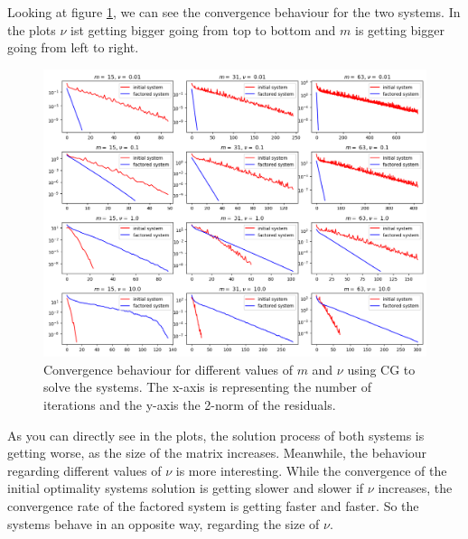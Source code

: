 \documentclass{amsart}
\theoremstyle{definition}
\theoremstyle{remark}
\numberwithin{equation}{section}
\begin{document}
Looking at figure \ref{fig:CG-convergence}, we can see the  convergence behaviour for the two systems. In the plots $\nu$ ist getting bigger going from top to bottom and $m$ is getting bigger going from left to right.
\begin{figure}[h!]
\centering
\includegraphics[scale=0.56]{./imgs/CG_analysis}
\caption{Convergence behaviour for different values of $m$ and $\nu$ using CG to solve the systems. The x-axis is representing the number of iterations
and the y-axis the 2-norm of the residuals.}
\label{fig:CG-convergence}
\end{figure}
As you can directly see in the plots, the solution process of both systems is getting worse, as the size of the matrix increases. Meanwhile, the behaviour 
regarding different values of $\nu$ is more interesting. While the convergence of the initial optimality systems solution is getting slower and slower if 
$\nu$ increases, the convergence rate of the factored system is getting faster and faster. So the systems behave in an opposite way, regarding the size of 
$\nu$.

\end{document}
